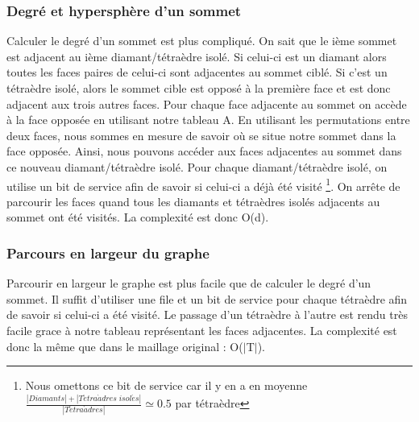 \subsubsection{Degré et hypersphère d'un sommet}
\noindent
Calculer le degré d'un sommet est plus compliqué. On sait que le ième sommet est adjacent au ième diamant/tétraèdre isolé. Si celui-ci est un diamant alors toutes les faces paires de celui-ci sont adjacentes au sommet ciblé. Si c'est un tétraèdre isolé, alors le sommet cible est opposé à la première face et est donc adjacent aux trois autres faces. Pour chaque face adjacente au sommet on accède à la face opposée en utilisant notre tableau A. En utilisant les permutations entre deux faces, nous sommes en mesure de savoir où se situe notre sommet dans la face opposée. Ainsi, nous pouvons accéder aux faces adjacentes au sommet dans ce nouveau diamant/tétraèdre isolé. Pour chaque diamant/tétraèdre isolé, on utilise un bit de service afin de savoir si celui-ci a déjà été visité \footnote{Nous omettons ce bit de service car il y en a en moyenne $\frac{|Diamants| + |T\acute{e}tra\grave{a}dres \; isol\acute{e}s|}{|T\acute{e}tra\grave{a}dres|}\simeq 0.5$ par tétraèdre}. On arrête de parcourir les faces quand tous les diamants et tétraèdres isolés adjacents au sommet ont été visités. La complexité est donc O(d).
\subsubsection{Parcours en largeur du graphe}
\noindent
Parcourir en largeur le graphe est plus facile que de calculer le degré d'un sommet. Il suffit d'utiliser une file et un bit de service pour chaque tétraèdre afin de savoir si celui-ci a été visité. Le passage d'un tétraèdre à l'autre est rendu très facile grace à notre tableau représentant les faces adjacentes. La complexité est donc la même que dans le maillage original : O($|$T$|$).
